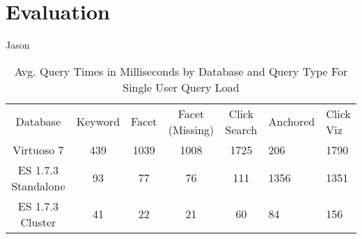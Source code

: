\section{Evaluation}
\label{sec:evaluation}
Jason


 \begin{table} 
    \begin{tabular}{ c c c c c }
        Database & Keyword & Facet & Facet (Missing) & Click Search & Anchored & Click Viz \\ 
        Virtuoso 7 & 439 & 1039 & 1008 & 1725 & 206 &  1790 \\ 
        ES 1.7.3 Standalone & 93 & 77 & 76 & 111 & 1356 & 1351 \\ 
        ES 1.7.3 Cluster & 41 & 22 & 21 & 60 & 84 & 156 \\ 
    \end{tabular} 
    \caption{Avg. Query Times in Milliseconds by Database and Query Type For Single User Query Load}
    \label{table:qt_single_user}
\end{table}

